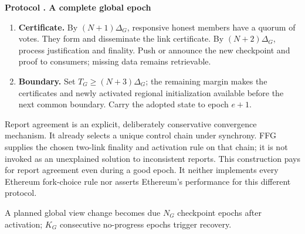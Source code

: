\documentclass[11pt,a4paper,onecolumn]{article}
\newcommand{\Tag}[1]{\mathsf{#1}}
\theoremstyle{remark}\newtheorem{example}[definition]{Example}
\newcounter{protocol}
\newenvironment{protocol}[2]{\refstepcounter{protocol}\label{#1}\begin{mdframed}[nobreak=true,linewidth=.6pt,skipabove=10pt,skipbelow=10pt,innertopmargin=8pt,innerbottommargin=8pt]\small\raggedright\noindent\textbf{Protocol \theprotocol. #2}\par\smallskip}{\end{mdframed}}
\begin{document}
\begin{protocol}{alg:global}{A complete global epoch}
\begin{enumerate}[label=\textbf{G\arabic*.}]
signs $(\Tag{FFG},c,e-1,g_{e-1},e,g_e)$ after the checks in
\cref{alg:finality}. Disseminate the vote through the backbone.
\item \textbf{Certificate.} By $(N+1)\Delta_G$, responsive honest members
have a quorum of votes. They form and disseminate the link certificate.
By $(N+2)\Delta_G$, process justification and finality. Push or announce the
new checkpoint and proof to consumers; missing data remains retrievable.
\item \textbf{Boundary.} Set $T_G\geq(N+3)\Delta_G$; the remaining margin
makes the certificates and newly activated regional initialization available
before the next common boundary. Carry the adopted state to epoch $e+1$.
\end{enumerate}
\end{protocol}

Report agreement is an explicit, deliberately conservative convergence mechanism.
It already selects a unique control chain under synchrony. FFG supplies the
chosen two-link finality and activation rule on that chain; it is not invoked
as an unexplained solution to inconsistent reports. This construction pays for
report agreement even during a good epoch. It neither implements every Ethereum
fork-choice rule nor asserts Ethereum's performance for this different protocol.

A planned global view change becomes due $N_G$ checkpoint epochs after
activation; $K_G$ consecutive no-progress epochs trigger recovery.
\end{document}
